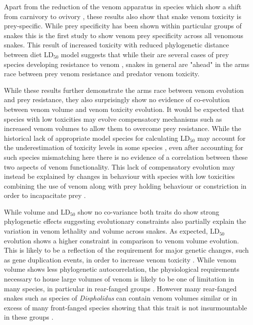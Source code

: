 Apart from the reduction of the venom apparatus in species which show a shift from carnivory to ovivory \citep{li2005eggs}, these results also show that snake venom toxicity is prey-specific. While prey specificity has been shown within particular groups of snakes \citep{barlow2009coevolution,richards2012venom,daltry1996diet} this is the first study to show venom prey specificity across all venomous snakes. This result of increased toxicity with reduced phylogenetic distance between diet LD$_{50}$ model suggests that while their are several cases of prey species developing resistance to venom \citep{lillywhite2002patterns}, snakes in general are "ahead" in the arms race between prey venom resistance and predator venom toxicity.


While these results further demonstrate the arms race between venom evolution and prey resistance, they also surprisingly show no evidence of co-evolution between venom volume and venom toxicity evolution. It would be expected that species with low toxicities may evolve compensatory mechanisms such as increased venom volumes to allow them to overcome prey resistance. While the historical lack of appropriate model species for calculating LD$_{50}$ may account for the underestimation of toxicity levels in some species \citep{da2001prey}, even after accounting for such species mismatching here there is no evidence of a correlation between these two aspects of venom functionality. This lack of compensatory evolution may instead be explained by changes in behaviour with species with low toxicities combining the use of venom along with prey holding behaviour or constriction in order to incapacitate prey \citep{shine1985prey}.


While volume and LD$_{50}$ show no co-variance both traits do show strong phylogenetic effects suggesting evolutionary constraints also partially explain the variation in venom lethality and volume across snakes. As expected, LD$_{50}$ evolution shows a higher constraint in comparison to venom volume evolution. This is likely to be a reflection of the requirement for major genetic changes, such as gene duplication events, in order to increase venom toxicity \citep{vonk2013king}. While venom volume shows less phylogenetic autocorrelation, the physiological requirements necessary to house large volumes of venom is likely to be one of limitation in many species, in particular in rear-fanged groups \citep{kardong1982evolution}. However many rear-fanged snakes such as species of \textit{Dispholidus} can contain venom volumes similar or in excess of many front-fanged species showing that this trait is not insurmountable in these groups \citep{kochva1980venom,fry2008evolution}.


